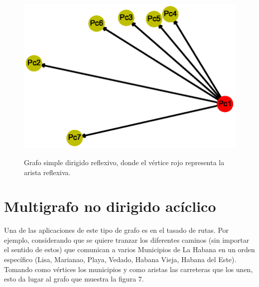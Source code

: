 \documentclass{article}
\begin{document}
\begin{center}

\end{center}
\begin{figure}[ht]
\begin{center}
\includegraphics[scale=0.7]{Graf6_random_layout.eps}\\
\caption{Grafo simple dirigido reflexivo, donde el vértice rojo representa la arista reflexiva.}
\end{center}
\end{figure}
\newpage

 \section{Multigrafo no dirigido acíclico}
Una de las aplicaciones de este tipo de grafo es en el tasado de rutas.
Por ejemplo, considerando que se quiere tranzar los diferentes caminos (sin importar el sentido de estos) que comunican a varios Municipios de La Habana en un orden específico (Lisa, Marianao, Playa, Vedado, Habana Vieja, Habana del Este). Tomando como vértices los municipios y como aristas las carreteras que los unen, esto da lugar al grafo que muestra la figura 7.\linebreak
\end{document}
